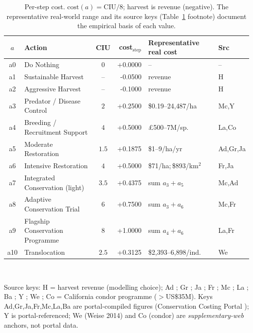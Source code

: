 \documentclass[11pt]{article}
\begin{document}
\begin{table}[h]\centering\footnotesize
\caption{Per-step cost. $\mathrm{cost}(a)=\mathrm{CIU}/8$; harvest is revenue
(negative). The representative real-world range and its source keys (Table~\ref{tab:cost}
footnote) document the empirical basis of each value.}
\label{tab:cost}
\begin{tabular}{@{}c l c r p{4.2cm} l@{}}
\toprule
$a$ & Action & CIU & cost$_{\text{step}}$ & Representative real cost & Src \\
\midrule

a0 & Do Nothing & $0$ & +0.0000 & -- & -- \\
a1 & Sustainable Harvest & -- & -0.0500 & revenue & H \\
a2 & Aggressive Harvest & -- & -0.1000 & revenue & H \\
a3 & Predator / Disease Control & $2$ & +0.2500 & \$0.19--24{,}487/ha & Mc,Y \\
a4 & Breeding / Recruitment Support & $4$ & +0.5000 & \pounds500--7M/sp. & La,Co \\
a5 & Moderate Restoration & $1.5$ & +0.1875 & \$1--9/ha/yr & Ad,Gr,Ja \\
a6 & Intensive Restoration & $4$ & +0.5000 & \$71/ha;\,\$893/km$^2$ & Fr,Ja \\
a7 & Integrated Conservation (light) & $3.5$ & +0.4375 & sum $a_3{+}a_5$ & Mc,Ad \\
a8 & Adaptive Conservation Trial & $6$ & +0.7500 & sum $a_3{+}a_6$ & Mc,Fr \\
a9 & Flagship Conservation Programme & $8$ & +1.0000 & sum $a_4{+}a_6$ & La,Fr \\
a10 & Translocation & $2.5$ & +0.3125 & \$2{,}393--6{,}898/ind. & We \\
\bottomrule
\end{tabular}
\\[2pt]
{\footnotesize\raggedright Source keys: H = harvest revenue (modelling choice);
Ad \cite{adams2012}; Gr \cite{green2012}; Ja \cite{james1999}; Fr \cite{frazee2003};
Mc \cite{mccarthy2012}; La \cite{laycock2009}; Ba \cite{balmford2003};
Y \cite{yong2023}; We \cite{weise2014}; Co = California condor programme
($>$US\$35M). Keys Ad,Gr,Ja,Fr,Mc,La,Ba are portal-compiled figures (Conservation Costing Portal \cite{iaconaportal,white2022}); Y is portal-referenced; We (Weise 2014) and Co (condor) are \emph{supplementary-web} anchors, not portal data.\par}
\end{table}
\end{document}
